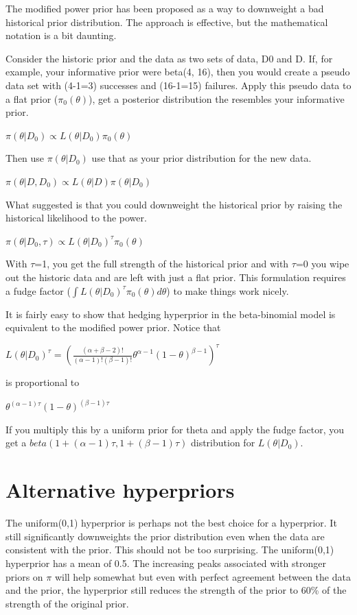 \documentclass[12pt]{article}
\begin{document}
The modified power prior has been proposed as a way to downweight a bad historical prior distribution. The approach is effective, but the mathematical notation is a bit daunting.

Consider the historic prior and the data as two sets of data, D0 and D. If, for example, your informative prior were  beta(4, 16), then you would create a pseudo data set with (4-1=3) successes and (16-1=15) failures. Apply this pseudo data to a flat prior ($\pi_0(\theta)$), get a posterior distribution the resembles your informative prior.

$\pi(\theta | D_0) \propto L(\theta|D_0)\pi_0(\theta)$ 

Then use $\pi(\theta | D_0)$ use that as your prior distribution for the new data.

$\pi(\theta | D,D_0) \propto L(\theta|D)\pi(\theta | D_0)$  

What \cite{ibrahim03} suggested is that you could downweight the historical prior by raising the historical likelihood to the power.

$\pi(\theta | D_0, \tau) \propto L(\theta|D_0)^{\tau}\pi_0(\theta)$

With $\tau$=1, you get the full strength of the historical prior and with $\tau$=0 you wipe out the historic data and are left with just a flat prior. This formulation requires a fudge factor ($\int L(\theta|D_0)^{\tau}\pi_0(\theta)d\theta$) to make things work nicely.

It is fairly easy to show that hedging hyperprior in the beta-binomial model is equivalent to the modified power prior. Notice that

$L(\theta|D_0)^{\tau}=\left(\frac{(\alpha+\beta-2)!}{(\alpha-1)!(\beta-1)!}\theta^{\alpha-1}(1-\theta)^{\beta-1}\right)^\tau$

is proportional to

$\theta^{(\alpha-1)\tau}(1-\theta)^{(\beta-1)\tau}$

If you multiply this by a uniform prior for theta and apply the fudge factor, you get a $beta(1+(\alpha-1)\tau,1+(\beta-1)\tau)$ distribution for $L(\theta|D_0)$.

\section{Alternative hyperpriors}
\label{sec:pr}

The uniform(0,1) hyperprior is perhaps not the best choice for a hyperprior. It still significantly downweights the prior distribution even when the data are consistent with the prior. This should not be too surprising. The uniform(0,1) hyperprior has a mean of 0.5. The increasing peaks associated with stronger priors on $\pi$ will help somewhat but even with perfect agreement between the data and the prior, the hyperprior still reduces the strength of the prior to 60\% of the strength of the original prior.
\end{document}
